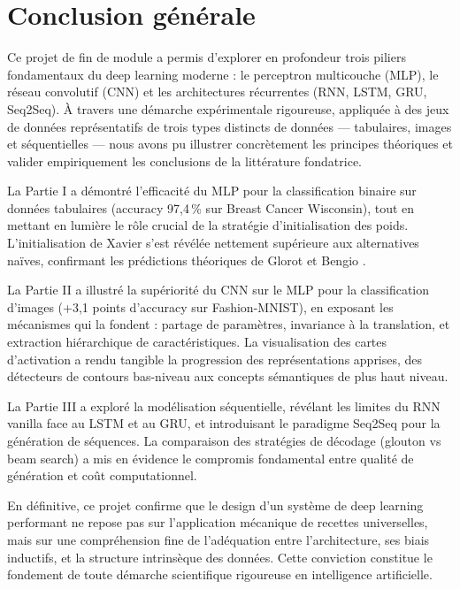 \documentclass[11pt,a4paper]{article}
\begin{document}
\section{Conclusion générale}

Ce projet de fin de module a permis d'explorer en profondeur trois piliers fondamentaux
du deep learning moderne : le perceptron multicouche (MLP), le réseau convolutif (CNN)
et les architectures récurrentes (RNN, LSTM, GRU, Seq2Seq). À travers une démarche
expérimentale rigoureuse, appliquée à des jeux de données représentatifs de trois
types distincts de données — tabulaires, images et séquentielles — nous avons pu
illustrer concrètement les principes théoriques et valider empiriquement les conclusions
de la littérature fondatrice.

La Partie I a démontré l'efficacité du MLP pour la classification binaire sur données
tabulaires (accuracy 97,4\,\% sur Breast Cancer Wisconsin), tout en mettant en lumière
le rôle crucial de la stratégie d'initialisation des poids. L'initialisation de Xavier
s'est révélée nettement supérieure aux alternatives naïves, confirmant les prédictions
théoriques de Glorot et Bengio \cite{glorot2010understanding}.

La Partie II a illustré la supériorité du CNN sur le MLP pour la classification d'images
(+3,1 points d'accuracy sur Fashion-MNIST), en exposant les mécanismes qui la fondent :
partage de paramètres, invariance à la translation, et extraction hiérarchique de
caractéristiques. La visualisation des cartes d'activation a rendu tangible la progression
des représentations apprises, des détecteurs de contours bas-niveau aux concepts
sémantiques de plus haut niveau.

La Partie III a exploré la modélisation séquentielle, révélant les limites du RNN vanilla
face au LSTM et au GRU, et introduisant le paradigme Seq2Seq pour la génération de
séquences. La comparaison des stratégies de décodage (glouton vs beam search) a mis
en évidence le compromis fondamental entre qualité de génération et coût computationnel.

En définitive, ce projet confirme que le design d'un système de deep learning performant
ne repose pas sur l'application mécanique de recettes universelles, mais sur une
compréhension fine de l'adéquation entre l'architecture, ses biais inductifs, et la
structure intrinsèque des données. Cette conviction constitue le fondement de toute
démarche scientifique rigoureuse en intelligence artificielle.
\end{document}

